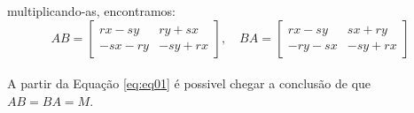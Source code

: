 multiplicando-as, encontramos:
\\

\begin{equation}\label{eq:eq01}
    AB =
    \begin{bmatrix}
        rx-sy  & ry+sx  \\
        -sx-ry & -sy+rx
    \end{bmatrix},\hspace{1em}
    BA =
    \begin{bmatrix}
        rx-sy  & sx+ry  \\
        -ry-sx & -sy+rx
    \end{bmatrix}
\end{equation}
\\

\textcolor{COLOR2}{A partir da Equação \ref{eq:eq01} é possivel chegar a conclusão de que $AB = BA = M$.}
\\